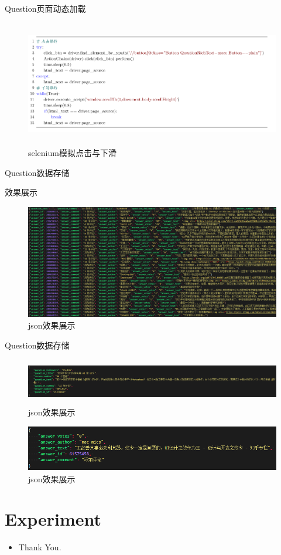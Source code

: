 \documentclass[aspectratio=169]{beamer}
\begin{document}
\begin{frame}{Question页面动态加载}
\begin{figure}
  \centering
  \includegraphics[width=13cm,height=5.5cm]{data}
  \caption{selenium模拟点击与下滑}
\end{figure}
\end{frame}

\begin{frame}{Question数据存储}
\begin{block}{效果展示}\end{block}
\begin{figure}
  \centering
  \includegraphics[width=12cm,height=5cm]{json}
  \caption{json效果展示}
\end{figure}
\end{frame}

\begin{frame}{Question数据存储}
\begin{figure}
  \centering
  \includegraphics[width=12cm,height=2cm]{question}
  \caption{json效果展示}
\end{figure}
\begin{figure}
  \centering
  \includegraphics[width=12cm,height=2cm]{answer}
  \caption{json效果展示}
\end{figure}
\end{frame}
\section{Experiment}

\begin{frame}
\begin{itemize}[<+-| alert@+>]
\item Thank You.
\end{itemize}
\end{frame}
\end{document}
